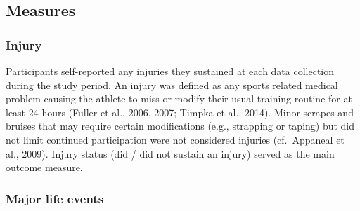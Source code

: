 \documentclass[
  english,
  man,floatsintext]{apa6}
\begin{document}
\hypertarget{measures}{%
\subsection{Measures}\label{measures}}

\hypertarget{injury}{%
\subsubsection{Injury}\label{injury}}

Participants self-reported any injuries they sustained at each data collection during the study period.
An injury was defined as any sports related medical problem causing the athlete to miss or modify their usual training routine for at least 24 hours (Fuller et al., 2006, 2007; Timpka et al., 2014).
Minor scrapes and bruises that may require certain modifications (e.g., strapping or taping) but did not limit continued participation were not considered injuries (cf.~Appaneal et al., 2009).
Injury status (did / did not sustain an injury) served as the main outcome measure.

\hypertarget{major-life-events}{%
\subsubsection{Major life events}\label{major-life-events}}
\end{document}
